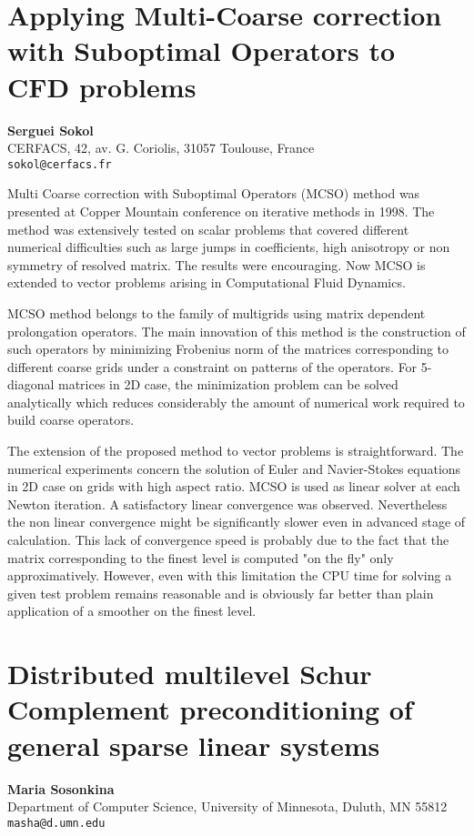 \documentclass[11pt]{article}
\newcommand{\nextab}[4]{
	\section{#2}
	{\bf #1} \\ \nopagebreak
	{#3} \\ \nopagebreak
	{\tt #4} \nopagebreak
	}
\begin{document}
\pagebreak


\nextab{Serguei Sokol}
	{Applying Multi-Coarse correction with Suboptimal
		Operators to CFD problems}
	{CERFACS, 42, av. G. Coriolis, 31057 Toulouse, France}
	{sokol@cerfacs.fr}

Multi Coarse correction with Suboptimal Operators (MCSO) method was
presented at Copper Mountain conference on iterative methods in 1998.
The method was extensively tested on scalar problems that covered different
numerical difficulties such as large jumps
in coefficients, high anisotropy or non symmetry of resolved matrix.
The results were encouraging. Now MCSO is extended to vector problems arising in
Computational Fluid Dynamics.

MCSO method belongs to the family of multigrids using matrix dependent
prolongation operators. The main innovation of this method is the
construction of such operators by minimizing Frobenius norm of
the matrices corresponding to different coarse grids under a constraint
on patterns of the operators. For 5-diagonal matrices in 2D case, the
minimization problem can be solved analytically which reduces
considerably the amount of numerical work required to build coarse
operators.

The extension of the proposed method to vector problems is
straightforward. The numerical experiments concern the solution of
Euler and Navier-Stokes equations in 2D case on grids with high
aspect ratio. MCSO is used as linear solver at each Newton iteration.
A satisfactory linear convergence was observed. Nevertheless the non
linear convergence might be significantly slower even in advanced stage
of calculation. This lack of convergence speed is probably due to the
fact that the matrix corresponding to the finest level is computed "on
the fly" only approximatively. However, even with this limitation the
CPU time for solving a given test problem remains reasonable and is
obviously far better than plain application of a smoother on the finest
level.


\nextab{Maria  Sosonkina}
	{Distributed multilevel Schur Complement preconditioning
		of general sparse linear systems}
	{Department of Computer Science,
		University of Minnesota,
		Duluth, MN 55812}
	{masha@d.umn.edu}
\end{document}
